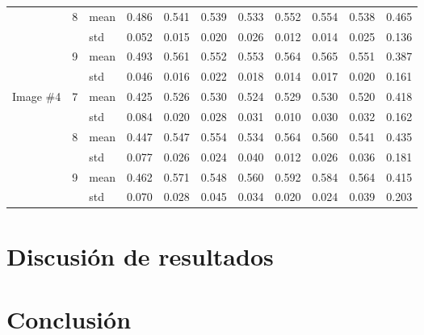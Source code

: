 \documentclass[conference]{IEEEtran}
\begin{document}
\begin{table*}
\begin{tabularx}{\textwidth}{|X|X|X|X|X|X|X|X|X|X|X|}
                  & \multirow{2}{*}{8} & mean & 0.486 & 0.541 & 0.539 & 0.533 & 0.552 & 0.554 & 0.538 & 0.465 \\ \cline{3-11} 
                  &                   & std & 0.052 & 0.015 & 0.020 & 0.026 & 0.012 & 0.014 & 0.025 & 0.136\\ \cline{2-11} 
                  & \multirow{2}{*}{9} & mean & 0.493 & 0.561 & 0.552 & 0.553 & 0.564 & 0.565 & 0.551 & 0.387 \\ \cline{3-11} 
                  &                   & std & 0.046 & 0.016 & 0.022 & 0.018 & 0.014 & 0.017 & 0.020 & 0.161 \\ \hline
\multirow{6}{*}{Image \#4} & \multirow{2}{*}{7} & mean & 0.425 & 0.526 & 0.530 & 0.524 & 0.529 & 0.530 & 0.520 & 0.418 \\ \cline{3-11} 
                  &                   & std & 0.084 & 0.020 & 0.028 & 0.031 & 0.010 & 0.030 & 0.032 & 0.162 \\ \cline{2-11} 
                  & \multirow{2}{*}{8} & mean & 0.447 & 0.547 & 0.554 & 0.534 & 0.564 & 0.560 & 0.541 & 0.435 \\ \cline{3-11} 
                  &                   & std &0.077 & 0.026 & 0.024 & 0.040 & 0.012 & 0.026 & 0.036 & 0.181 \\ \cline{2-11} 
                  & \multirow{2}{*}{9} & mean & 0.462 & 0.571 & 0.548 & 0.560 & 0.592 & 0.584 & 0.564 & 0.415\\ \cline{3-11} 
                  &                   & std & 0.070 & 0.028 & 0.045 & 0.034 & 0.020 & 0.024 & 0.039 & 0.203 \\ \hline
\end{tabularx}
\end{table*}

\section{Discusión de resultados} \label{sec:di}

\section{Conclusión} \label{sec:co}

 


\end{document}
